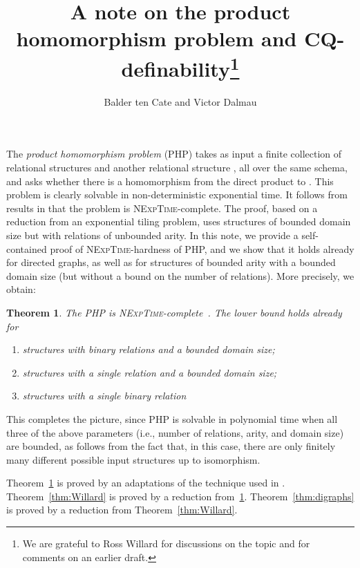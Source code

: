 \documentclass{article}
\makeatletter
\newtheorem{theorem}{Theorem}
\newcommand{\nexptime}{\textsc{NExpTime}\xspace}
\newcommand{\manuallabel}[2]{\def\@currentlabel{#2}\label{#1}}
\makeatother
\begin{document}
\title{A note on the product homomorphism problem and CQ-definability\thanks{We are grateful to Ross Willard for discussions on the topic
  and 
  for comments on an earlier draft.}}

\author{Balder ten Cate and Victor Dalmau}

\maketitle
 
The \emph{product homomorphism problem} (PHP) takes as input a finite
collection of relational structures  and another
relational structure , all over the same schema, and asks whether
there is a homomorphism from the direct product  to . This problem is clearly solvable in
non-deterministic exponential time. It follows from results in
\cite{Willard10} that the problem is \nexptime-complete. The proof,
based on a reduction from an exponential tiling problem, uses
structures of bounded domain size but with 
relations of unbounded arity.  In this note, we provide a
self-contained proof of \nexptime-hardness of PHP,
and we show that it holds already for directed
graphs, as well as for structures of
bounded arity with a bounded domain size (but without a bound on the
number of relations). More precisely, we obtain:

\begin{theorem}
  \manuallabel{thm:binary}{\thetheorem.1}
  \manuallabel{thm:Willard}{\thetheorem.2}
  \manuallabel{thm:digraphs}{\thetheorem.3}
The PHP is \nexptime-complete~\cite{Willard10}. The lower bound
holds already for
\begin{enumerate}
\item structures with binary relations and a bounded domain size;
\item structures with a single relation and a bounded domain size;
\item structures with a single binary relation
\end{enumerate}
\end{theorem}
This completes the picture, since PHP is solvable in polynomial time when all three of the
above parameters (i.e., number of relations, arity, and domain size) are bounded, as follows from the fact that, in this case, there are only finitely
many different possible input structures up to isomorphism. 

 Theorem~\ref{thm:binary} is proved by an adaptations of the technique
used in \cite{Willard10}. Theorem~\ref{thm:Willard} is proved by a
reduction
from~\ref{thm:binary}. Theorem~\ref{thm:digraphs} is proved
by a reduction 
from 
Theorem~\ref{thm:Willard}.
\end{document}
